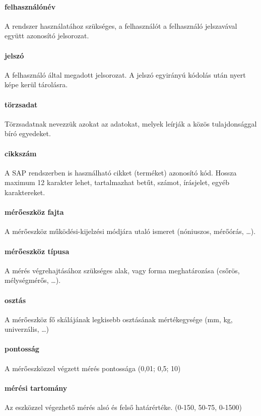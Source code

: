 \documentclass[a4paper,12pt]{report}
\begin{document}
\paragraph*{felhasználónév} A rendszer használatához szükséges, a felhasználót a 
felhasználó jelszavával együtt azonosító jelsorozat.

\paragraph*{jelszó} A felhasználó által megadott jelsorozat. A jelszó egyirányú kódolás
után nyert képe kerül tárolásra.

\paragraph*{törzsadat} Törzsadatnak nevezzük azokat az adatokat, melyek leírják a közös
tulajdonsággal bíró egyedeket.

\paragraph*{cikkszám} A SAP rendszerben is használható cikket (terméket) azonosító
kód. Hossza maximum 12 karakter lehet, tartalmazhat betűt, számot, írásjelet, egyéb 
karaktereket. 

\paragraph*{mérőeszköz fajta} A mérőeszköz működési-kijelzési módjára utaló ismeret
(nóniuszos, mérőórás, \dots).

\paragraph*{mérőeszköz típusa} A mérés végrehajtásához szükséges alak, vagy forma meghatározása (csőrös, mélységmérős, \dots).

\paragraph*{osztás} A mérőeszköz fő skálájának legkisebb osztásának mértékegysége 
(mm, kg, univerzális, \dots)

\paragraph*{pontosság} A mérőeszközzel végzett mérés pontossága (0,01; 0,5; 10)

\paragraph*{mérési tartomány} Az eszközzel végezhető mérés alsó és felső határértéke.
(0-150, 50-75, 0-1500)
\end{document}
